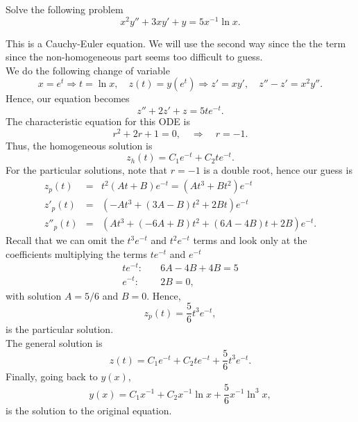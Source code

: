 \documentclass[11pt]{article}
\begin{document}
\begin{problem}
Solve the following problem
\begin{equation*}     
     x^{2}y''+3xy'+y=5x^{-1}\ln x.
\end{equation*}
\end{problem}
\begin{solution}
This is a Cauchy-Euler equation. We will use the second way since the the term since the non-homogeneous part seems too difficult to guess.\\
We do the following change of variable
\[x = e^{t} \Rightarrow t=\ln x, \quad z(t) = y(e^{t})\Rightarrow z' = xy', \quad z''-z'=x^{2}y''.\]
Hence, our equation becomes
\[z''+2z'+z=5te^{-t}.\]
The characteristic equation for this ODE is 
\begin{equation}
r^2 +2r +1 =0, \quad  \Rightarrow \quad r= -1.
\end{equation}
Thus, the homogeneous solution is
\begin{equation}
z_{h}(t) = C_{1} e^{- t} + C_{2} te^{-t}.
\end{equation}
For the particular solutions, note that $r=-1$ is a double root, hence our guess is 
\begin{eqnarray*}
z_{p}(t) & = & t^{2}(At+B)e^{-t} = (At^{3}+Bt^{2})e^{-t} \\
z'_{p}(t) & = & (-At^{3}+(3A-B)t^{2}+2Bt)e^{-t} \\
z''_{p}(t) & = & (At^{3}+(-6A+B)t^{2}+(6A-4B)t+2B)e^{-t}.
\end{eqnarray*}
Recall that we can omit the $t^{3}e^{-t}$ and $t^{2}e^{-t}$ terms and look only at the coefficients multiplying the terms $te^{-t}$ and $e^{-t}$ 
\begin{equation*} \begin{split}
te^{-t}:& \quad  6A -4B +4B = 5 \\
e^{-t}:& \quad  2B =0,
\end{split}
\end{equation*}
with solution $A=5/6$ and $B=0$. Hence, 
$$z_{p}(t) = \frac{5}{6}t^{3}e^{-t},$$ 
is the particular solution.\\
The general solution is 
\[z(t)=  C_{1} e^{- t} + C_{2} te^{-t} +\frac{5}{6}t^{3}e^{-t}.\]
Finally, going back to $y(x)$,
\[\boxed{y(x)=C_{1}x^{-1}+C_{2}x^{-1}\ln x +\frac{5}{6}x^{-1}\ln^{3}x},\]
is the solution to the original equation.
\end{solution}
\end{document}
